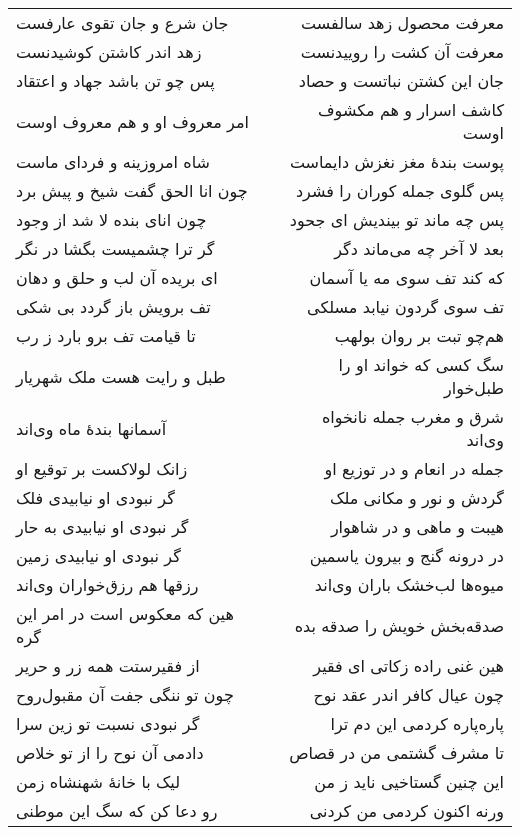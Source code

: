 \begin{center}
\begin{longtable}{l p{0.5cm} r}
جان شرع و جان تقوی عارفست
&&
معرفت محصول زهد سالفست
\\
زهد اندر کاشتن کوشیدنست
&&
معرفت آن کشت را روییدنست
\\
پس چو تن باشد جهاد و اعتقاد
&&
جان این کشتن نباتست و حصاد
\\
امر معروف او و هم معروف اوست
&&
کاشف اسرار و هم مکشوف اوست
\\
شاه امروزینه و فردای ماست
&&
پوست بندهٔ مغز نغزش دایماست
\\
چون انا الحق گفت شیخ و پیش برد
&&
پس گلوی جمله کوران را فشرد
\\
چون انای بنده لا شد از وجود
&&
پس چه ماند تو بیندیش ای جحود
\\
گر ترا چشمیست بگشا در نگر
&&
بعد لا آخر چه می‌ماند دگر
\\
ای بریده آن لب و حلق و دهان
&&
که کند تف سوی مه یا آسمان
\\
تف برویش باز گردد بی شکی
&&
تف سوی گردون نیابد مسلکی
\\
تا قیامت تف برو بارد ز رب
&&
هم‌چو تبت بر روان بولهب
\\
طبل و رایت هست ملک شهریار
&&
سگ کسی که خواند او را طبل‌خوار
\\
آسمانها بندهٔ ماه وی‌اند
&&
شرق و مغرب جمله نانخواه وی‌اند
\\
زانک لولاکست بر توقیع او
&&
جمله در انعام و در توزیع او
\\
گر نبودی او نیابیدی فلک
&&
گردش و نور و مکانی ملک
\\
گر نبودی او نیابیدی به حار
&&
هیبت و ماهی و در شاهوار
\\
گر نبودی او نیابیدی زمین
&&
در درونه گنج و بیرون یاسمین
\\
رزقها هم رزق‌خواران وی‌اند
&&
میوه‌ها لب‌خشک باران وی‌اند
\\
هین که معکوس است در امر این گره
&&
صدقه‌بخش خویش را صدقه بده
\\
از فقیرستت همه زر و حریر
&&
هین غنی راده زکاتی ای فقیر
\\
چون تو ننگی جفت آن مقبول‌روح
&&
چون عیال کافر اندر عقد نوح
\\
گر نبودی نسبت تو زین سرا
&&
پاره‌پاره کردمی این دم ترا
\\
دادمی آن نوح را از تو خلاص
&&
تا مشرف گشتمی من در قصاص
\\
لیک با خانهٔ شهنشاه زمن
&&
این چنین گستاخیی ناید ز من
\\
رو دعا کن که سگ این موطنی
&&
ورنه اکنون کردمی من کردنی
\\
\end{longtable}
\end{center}
